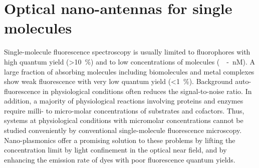 \section{Optical nano-antennas for single molecules}
Single-molecule fluorescence spectroscopy is usually limited to fluorophores with high quantum yield (\SI{>10}{\percent}) and to low concentrations of molecules (\SI{}{\pM-nM}).
A large fraction of absorbing molecules including biomolecules and metal complexes show weak fluorescence with very low quantum yield (\SI{<1}{\percent}).
Background auto-fluorescence in physiological conditions often reduces the signal-to-noise ratio.
In addition, a majority of physiological reactions involving proteins and enzymes require milli- to micro-molar concentrations of substrates and cofactors.\cite{craighead2006future,punj2013gold,fabrizio2016roadmap,punj2014thesis}
Thus, systems at physiological conditions with micromolar concentrations cannot be studied conveniently by conventional single-molecule fluorescence microscopy.
Nano-plasmonics offer a promising solution to these problems by lifting the concentration limit by light confinement in the optical near field, and by enhancing the emission rate of dyes with poor fluorescence quantum yields.


